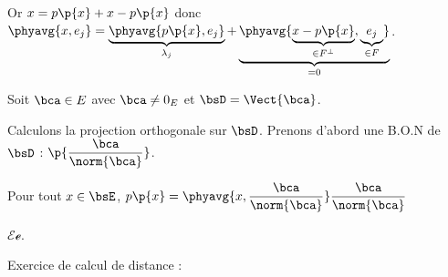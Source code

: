 \documentclass[a4paper,french,bookmarks]{article}
\begin{document}
    Or $x = p\p{x} + x - p\p{x}$ donc $\phyavg{x, e_j} = \underbrace{\phyavg{p\p{x}, e_j}}_{\lambda_j} + \underbrace{\phyavg{\underbrace{x - p\p{x}}_{\in F^\bot}, \underbrace{e_j}_{\in F}}}_{= 0}$.
    
    \begin{example}{}{}
        \begin{enumerate}
            \itt {} Soit $\bca \in E$ avec $\bca \neq 0_E$ et $\bsD = \Vect{\bca}$.
            
            Calculons la projection orthogonale sur $\bsD$. Prenons d'abord une B.O.N de $\bsD$ : $\p{\dfrac{\bca}{\norm{\bca}}}$.
            
            Pour tout $x \in \bsE$, $p\p{x} = \phyavg{x, \dfrac{\bca}{\norm{\bca}}}\dfrac{\bca}{\norm{\bca}}$
            
            $\mathscr{E} \mathscr{e}$.
        \end{enumerate}
    \end{example}
    
    Exercice de calcul de distance :
    
\end{document}
